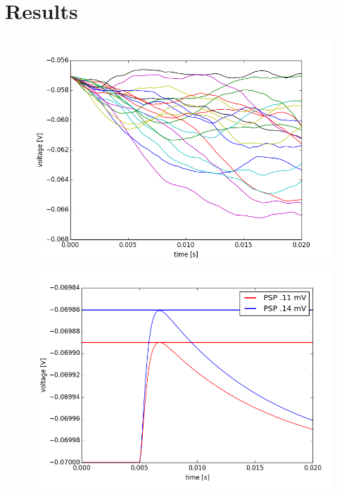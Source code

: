 \documentclass[12pt,a4paper, bibliography=totoc, listof=numbered, footexclude, BCOR=8.25mm, twoside]{scrartcl}
\begin{document}
  \section{Results}
  	\begin{figure}[H]
  	    	\begin{minipage}[hbt]{8.4 cm}
  	  		\centering
  	  		  \includegraphics[width=1.0\linewidth]{./Plots/Our_Plots/noise}
  	  		  \caption{}
  	  		  \label{fig:noise}
  	    		
  	    	\end{minipage}
  	    	\hfill
  	    	\begin{minipage}[hbt]{8.4 cm}
  
  	    \centering
  	    \includegraphics[width=1.0\linewidth]{./Plots/Our_Plots/PSP}
  	    \caption{}
  	    \label{fig:PSP}
  	    	\end{minipage}
  	    	\end{figure}
  
\end{document}
